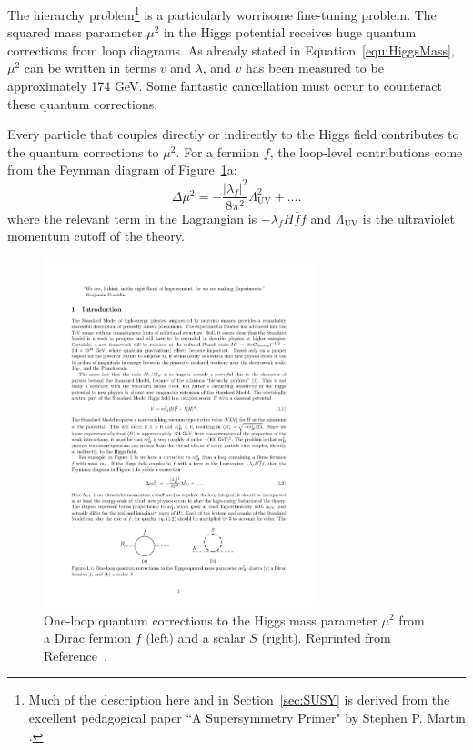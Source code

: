 The hierarchy problem\footnote{Much of the description here and in Section~\ref{sec:SUSY} is derived from the excellent pedagogical paper ``A Supersymmetry Primer" by Stephen P. Martin \cite{SUSYprimer}.} is a particularly worrisome fine-tuning problem. The squared mass parameter $\mu^2$ in the Higgs potential receives huge quantum corrections from loop diagrams. As already stated in Equation~\ref{equ:HiggsMass}, $\mu^2$ can be written in terms $v$ and $\lambda$, and $v$ has been measured to be approximately 174 GeV. Some fantastic cancellation must occur to counteract these quantum corrections.

Every particle that couples directly or indirectly to the Higgs field contributes to the quantum corrections to $\mu^2$. For a fermion $f$, the loop-level contributions come from the Feynman diagram of Figure~\ref{fig:hierarchy}a:
\begin{equation}
\Delta\mu^2 = -\frac{|\lambda_f|^2}{8\pi^2}\Lambda^2_\mathrm{UV} + ....
\label{equ:corrFermion}
\end{equation}
where the relevant term in the Lagrangian is $-\lambda_fH\bar{f}f$ and $\Lambda_\mathrm{UV}$ is the ultraviolet momentum cutoff of the theory. 

\begin{figure}[htbp]
    \centering
    \includegraphics[width=0.7\textwidth]{Figures/Theory/hierarchyLoop.pdf}
    \caption{One-loop quantum corrections to the Higgs mass parameter $\mu^2$ from a Dirac fermion $f$ (left) and a scalar $S$ (right).
    Reprinted from Reference~\cite{SUSYprimer}.}
    \label{fig:hierarchy}
\end{figure}


